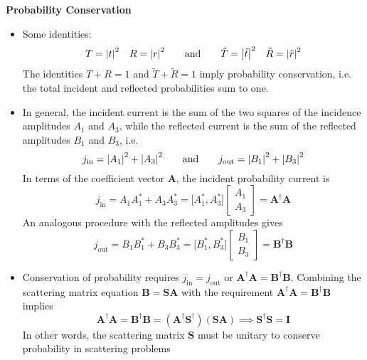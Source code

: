 \documentclass[11pt, a4paper]{article}
\newcommand{\eqtext}[1]{\qquad \text{#1} \qquad}
\renewcommand{\vec}[1]{\bm{#1}} %
\newcommand{\mat}[1]{\mathbf{#1}} %
\begin{document}
\textbf{Probability Conservation}
\begin{itemize}
	\item Some identities:
	\begin{equation*}
		T = \abs{t}^{2} \quad R = \abs{r}^{2} \eqtext{and} 		\tilde{T} = \abs{\tilde{t}}^{2} \quad \tilde{R} = \abs{\tilde{r}}^{2}
	\end{equation*}
	The identities $ T + R = 1 $ and $ \tilde{T} + \tilde{R} = 1 $ imply probability conservation, i.e. the total incident and reflected probabilities sum to one. 
	
	\item In general, the incident current is the sum of the two squares of the incidence amplitudes $ A_{1} $ and $ A_{3} $, while the reflected current is the sum of the reflected amplitudes $ B_{1} $ and $ B_{3} $, i.e.
	\begin{equation*}
		j_{\text{in}} = \abs{A_{1}}^{2} + \abs{A_{3}}^{2} \eqtext{and} j_{\text{out}} = \abs{B_{1}}^{2} + \abs{B_{3}}^{2}
	\end{equation*}
	In terms of the coefficient vector $ \vec{A} $, the incident probability current is
	\begin{equation*}
		j_{\text{in}} = A_{1}A_{1}^{*} + A_{3}A_{3}^{*} = \big[A_{1}^{*}, A_{3}^{*}\big]
		\begin{bmatrix}
			A_{1}\\
			A_{3}
		\end{bmatrix}
		= \vec{A}^{\dagger}\vec{A}
	\end{equation*}
	An analogous procedure with the reflected amplitudes gives
	\begin{equation*}
		j_{\text{out}} = B_{1}B_{1}^{*} + B_{3}B_{3}^{*} = \big[B_{1}^{*}, B_{3}^{*}\big]
		\begin{bmatrix}
			B_{1}\\
			B_{3}
		\end{bmatrix}
		= \vec{B}^{\dagger}\vec{B}
	\end{equation*}	
	
	\item Conservation of probability requires $ j_{\text{in}} = j_{\text{out}} $ or $ \vec{A}^{\dagger}\vec{A} = \vec{B}^{\dagger}\vec{B} $. Combining the scattering matrix equation $ \vec{B} = \mat{S}\vec{A} $ with the requirement $ \vec{A}^{\dagger}\vec{A} = \vec{B}^{\dagger}\vec{B} $ implies
	\begin{equation*}
		\vec{A}^{\dagger}\vec{A} = \vec{B}^{\dagger}\vec{B} = (\vec{A}^{\dagger}\mat{S}^{\dagger})(\mat{S}\vec{A}) \implies \vec{S}^{\dagger}\mat{S} = \mat{I}
	\end{equation*}
	In other words, the scattering matrix $ \mat{S} $ must be unitary to conserve probability in scattering problems
\end{itemize}
\end{document}
